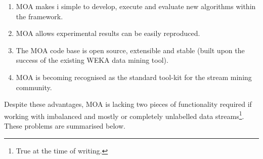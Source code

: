 \documentclass[twoside,a4paper]{refart}
\begin{document}
\begin{enumerate}
\item MOA makes i simple to develop, execute and evaluate new algorithms within the framework.
\item MOA allows experimental results can be easily reproduced.
\item The MOA code base is open source, extensible and stable (built upon the success of the existing WEKA \cite{weka} data mining tool).
\item MOA is becoming recognised as the standard tool-kit for the stream mining community.
\end{enumerate}

Despite these advantages, MOA is lacking two pieces of functionality required if working with imbalanced and mostly or completely unlabelled data streams\footnote{True at the time of writing.}. These problems are summarised below.
\end{document}
